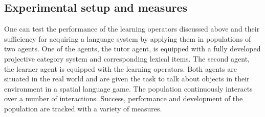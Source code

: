 \subsection{Experimental setup and measures}
One can test the performance of the learning operators discussed above and their 
sufficiency for acquiring a language system by applying them in populations
of two agents. One of the agents, the tutor agent, is equipped with a fully 
developed projective category system and corresponding lexical items. 
The second agent, the learner agent is equipped with the learning operators.
Both agents are situated in the real world and are given the task to talk about
objects in their environment in a spatial language game. The population
continuously interacts over a number of interactions. Success, performance
and development of the population are tracked with a variety of measures.

